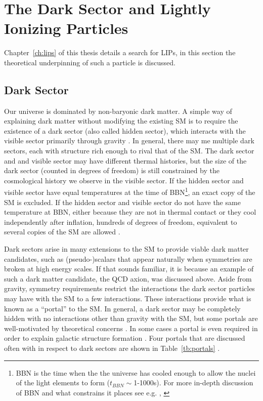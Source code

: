 \section{The Dark Sector and Lightly Ionizing Particles}
\label{sec:dark_sector}
Chapter~\ref{ch:lips} of this thesis details a search for \ac{LIP}s, in this section the theoretical underpinning of such a particle is discussed. 

\subsection{Dark Sector}
Our universe is dominated by non-baryonic dark matter. A simple way of explaining dark matter without modifying the existing \ac{SM} is to require the existence of a dark sector (also called hidden sector), which interacts with the visible sector primarily through gravity \cite{Foot2014}. In general, there may me multiple dark sectors, each with structure rich enough to rival that of the \ac{SM}. The dark sector and and visible sector may have different thermal histories, but the size of the dark sector (counted in degrees of freedom) is still constrained by the cosmological history we observe in the visible sector. If the hidden sector and visible sector have equal temperatures at the time of \ac{BBN}\footnote{\ac{BBN} is the time when the the universe has cooled enough to allow the nuclei of the light elements to form ($t_{BBN}\sim$1-1000s). For more in-depth discussion of \ac{BBN} and what constrains it places see e.g. \cite{Ryden2006}, \cite{Kolb1990}}, an exact copy of the \ac{SM} is excluded. If the hidden sector and visible sector do not have the same temperature at \ac{BBN}, either because they are not in thermal contact or they cool independently after inflation, hundreds of degrees of freedom, equivalent to several copies of the \ac{SM} are allowed \cite{Feng2010}.

Dark sectors arise in many extensions to the \ac{SM} to provide viable dark matter candidates, such as (pseudo-)scalars that appear naturally when symmetries are broken at high energy scales. If that sounds familiar, it is because an example of such a dark matter candidate, the QCD axion, was discussed above. Aside from gravity, symmetry requirements restrict the interactions the dark sector particles may have with the \ac{SM} to a few interactions. These interactions provide what is known as a ``portal'' to the \ac{SM}. In general, a dark sector may be completely hidden with no interactions other than gravity with the \ac{SM}, but some portals are well-motivated by theoretical concerns \cite{Essig2013} \cite{Feng2010}. In some cases a portal is even required in order to explain galactic structure formation \cite{Foot2014}. Four portals that are discussed often with in respect to dark sectors are shown in Table~\ref{tb:portals} \cite{Essig2013}.

